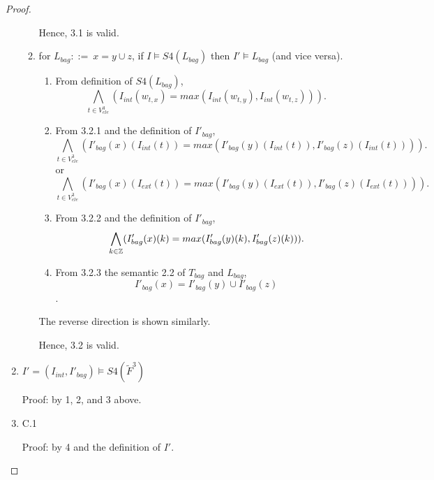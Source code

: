 \begin{proof}
\begin{enumerate}[1.]
\begin{enumerate}[3.1]
Hence, 3.1 is valid.


\item %
for $L_{bag}::=\ x = y\cup z$, if $I \models S4(L_{bag})$ then $I'\models L_{bag}$ (and vice versa). \\

\begin{enumerate}[3.2.1]
\item %
From definition of $S4(L_{bag})$,
$$\underset{t\in V^3_{ele}}{\bigwedge}(I_{int}(w_{t,x}) = max(I_{int}(w_{t,y}),I_{int}(w_{t,z}))).$$

\item %
From 3.2.1 and the definition of $I'_{bag}$,
$$\underset{t\in V^3_{ele}}{\bigwedge}(I'_{bag}(x)(I_{int}(t)) = max(I'_{bag}(y)(I_{int}(t)),I'_{bag}(z)(I_{int}(t)))).$$
or $$\underset{t\in V^3_{ele}}{\bigwedge}(I'_{bag}(x)(I_{ext}(t)) = max(I'_{bag}(y)(I_{ext}(t)),I'_{bag}(z)(I_{ext}(t)))).$$

\item %
From 3.2.2 and the definition of $I'_{bag}$,
$$\underset{k\in \mathbb{Z}}{\bigwedge}(I'_{bag}(x)(k) = max(I'_{bag}(y)(k),I'_{bag}(z)(k))).$$

\item %
From 3.2.3 the semantic 2.2 of $T_{bag}$ and $L_{bag}$,
$$I'_{bag}(x) = I'_{bag}(y) \cup I'_{bag}(z)$$.

\end{enumerate}
The reverse direction is shown similarly.

Hence, 3.2 is valid.

\end{enumerate} %

\item %
$I'=(I_{int},I'_{bag})\models S4(\tilde{F}^3)$

Proof: by 1, 2, and 3 above.


\item %
C.1

Proof: by 4 and the definition of $I'$.

\end{enumerate}
\end{proof}

